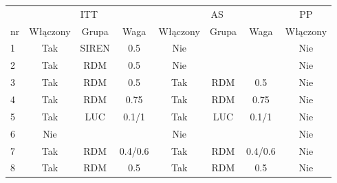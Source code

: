 \begin{tabular}{lccccccc}
 \toprule
 \multicolumn{1}{c}{ } & \multicolumn{3}{c}{ITT} & \multicolumn{3}{c}{AS}  & \multicolumn{1}{c}{PP} \\
 \cmidrule(r){2-4} \cmidrule(r){5-7} 
 nr & Włączony & Grupa & Waga & Włączony & Grupa & Waga & Włączony  \\
 1 & Tak & SIREN & 0.5 & Nie & \ & \ & Nie \\
 2 & Tak & RDM & 0.5 & Nie & \ & \ & Nie \\
 3 & Tak & RDM & 0.5 & Tak & RDM & 0.5 & Nie \\ 
 4 & Tak & RDM & 0.75 & Tak & RDM & 0.75 & Nie \\ 
 5 & Tak & LUC & 0.1/1 & Tak & LUC & 0.1/1 & Nie \\ 
 6 & Nie & \ & \ &  Nie & \ & \ & Nie \\
 7 & Tak & RDM & 0.4/0.6 & Tak & RDM & 0.4/0.6 & Nie \\ 
 8 & Tak & RDM & 0.5 & Tak & RDM & 0.5 & Nie \\ 
 
 \bottomrule
\end{tabular}